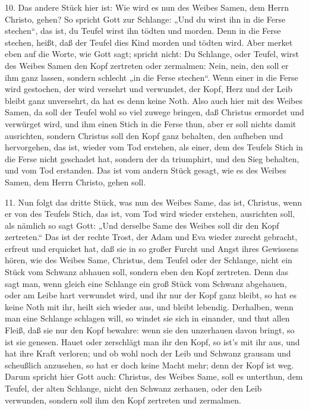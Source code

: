 10. Das andere Stück hier ist: Wie wird es nun des Weibes Samen, dem Herrn Christo, gehen? So spricht Gott zur Schlange: „Und du wirst ihn in die Ferse stechen“, das ist, du Teufel wirst ihn tödten und morden. Denn in die Ferse stechen, heißt, daß der Teufel dies Kind morden und tödten wird. Aber merket eben auf die Worte, wie Gott sagt; spricht nicht: Du Schlange, oder Teufel, wirst des Weibes Samen den Kopf zertreten oder zermalmen: Nein, nein, den soll er ihm ganz lassen, sondern schlecht „in die Ferse stechen“. Wenn einer in die Ferse wird gestochen, der wird versehrt und verwundet, der Kopf, Herz und der Leib bleibt ganz unversehrt, da hat es denn keine Noth. Also auch hier mit des Weibes Samen, da soll der Teufel wohl so viel zuwege bringen, daß Christus ermordet und verwürget wird, und ihm einen Stich in die Ferse thun, aber er soll nichts damit ausrichten, sondern Christus soll den Kopf ganz behalten, den aufheben und hervorgehen, das ist, wieder vom Tod erstehen, als einer, dem des Teufels Stich in die Ferse nicht geschadet hat, sondern der da triumphirt, und den Sieg behalten, und vom Tod erstanden. Das ist vom andern Stück gesagt, wie es des Weibes Samen, dem Herrn Christo, gehen soll.

11. Nun folgt das dritte Stück, was nun des Weibes Same, das ist, Christus, wenn er von des Teufels Stich, das ist, vom Tod wird wieder erstehen, ausrichten soll, als nämlich so sagt Gott: „Und derselbe Same des Weibes soll dir den Kopf zertreten.“ Das ist der rechte Trost, der Adam und Eva wieder zurecht gebracht, erfreut und erquicket hat, daß sie in so großer Furcht und Angst ihres Gewissens hören, wie des Weibes Same, Christus, dem Teufel oder der Schlange, nicht ein Stück vom Schwanz abhauen soll, sondern eben den Kopf zertreten. Denn das sagt man, wenn gleich eine Schlange ein groß Stück vom Schwanz abgehauen, oder am Leibe hart verwundet wird, und ihr nur der Kopf ganz bleibt, so hat es keine Noth mit ihr, heilt sich wieder aus, und bleibt lebendig. Derhalben, wenn man eine Schlange schlagen will, so windet sie sich in einander, und thut allen Fleiß, daß sie nur den Kopf bewahre: wenn sie den unzerhauen davon bringt, so ist sie genesen. Hauet oder zerschlägt man ihr den Kopf, so ist's mit ihr aus, und hat ihre Kraft verloren; und ob wohl noch der Leib und Schwanz grausam und scheußlich anzusehen, so hat er doch keine Macht mehr; denn der Kopf ist weg. Darum spricht hier Gott auch: Christus, des Weibes Same, soll es unterthun, dem Teufel, der alten Schlange, nicht den Schwanz zerhauen, oder den Leib verwunden, sondern soll ihm den Kopf zertreten und zermalmen.

